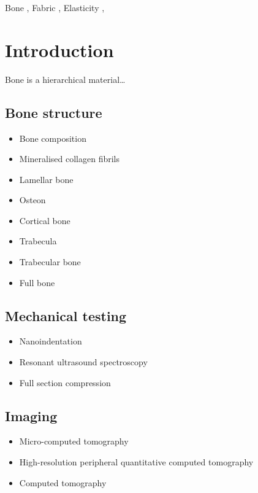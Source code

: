 \documentclass[a4paper,fleqn]{DC_ArtStyle}
\begin{document}
	\begin{keywords}
		Bone \sep%
		Fabric \sep%
		Elasticity \sep%
	\end{keywords}
	

	\begin{NoHyper}
		\maketitle
	\end{NoHyper}
	
	
	\section{Introduction}
	Bone is a hierarchical material\dots
	\subsection{Bone structure}
	\begin{itemize}
		\item Bone composition
		\item Mineralised collagen fibrils
		\item Lamellar bone
		\item Osteon
		\item Cortical bone
		\item Trabecula
		\item Trabecular bone
		\item Full bone
	\end{itemize}
	\subsection{Mechanical testing}
	\begin{itemize}
		\item Nanoindentation
		\item Resonant ultrasound spectroscopy
		\item Full section compression
	\end{itemize}
	\subsection{Imaging}
	\begin{itemize}
		\item Micro-computed tomography
		\item High-resolution peripheral quantitative computed tomography
		\item Computed tomography
	\end{itemize}
\end{document}
